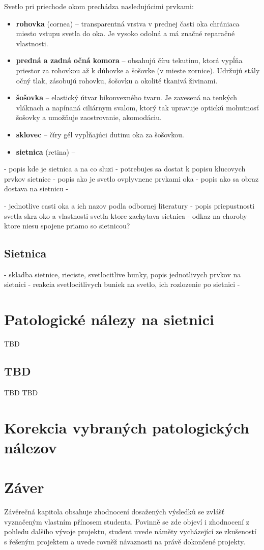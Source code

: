 Svetlo pri priechode okom prechádza nasledujúcimi prvkami\cite{zloz_oka}:
\begin{itemize}
\item \textbf{rohovka} (cornea) -- transparentná vrstva v prednej časti oka chrániaca miesto vstupu svetla do oka. Je vysoko odolná a má značné reparačné vlastnosti.
\item \textbf{predná a zadná očná komora} -- obsahujú číru tekutinu, ktorá vypĺňa priestor za rohovkou až k dúhovke a šošovke (v mieste zornice). Udržujú stály očný tlak, zásobujú rohovku, šošovku a okolité tkanivá živinami.
\item \textbf{šošovka} -- elastický útvar bikonvexného tvaru. Je zavesená na tenkých vláknach a napínaná ciliárnym svalom, ktorý tak upravuje optickú mohutnosť šošovky a umožňuje zaostrovanie, akomodáciu.
\item \textbf{sklovec} -- číry gél vypĺňajúci dutinu oka za šošovkou.
\item \textbf{sietnica} (retina) -- 
\end{itemize}

- popis kde je sietnica a na co sluzi \cite{vlast_oka}
- potrebujes sa dostat k popisu klucovych prvkov sietnice
- popis ako je svetlo ovplyvnene prvkami oka
- popis ako sa obraz dostava na sietnicu
- 

- jednotlive casti oka a ich nazov podla odbornej literatury
- popis priepustnosti svetla skrz oko a vlastnosti svetla ktore zachytava sietnica
- odkaz na choroby ktore niesu spojene priamo so sietnicou?

\section{Sietnica}\label{sec:sietnica}
- skladba sietnice, rieciste, svetlocitlive bunky, popis jednotlivych prvkov na sietnici
- reakcia svetlocitlivych buniek na svetlo, ich rozlozenie po sietnici
- 

\chapter{Patologické nálezy na sietnici}\label{ch:kap2}
TBD\cite{prim}
\section{TBD}
TBD\cite{sec}
TBD\cite{bio}

\chapter{Korekcia vybraných patologických nálezov}


\chapter{Záver}
Závěrečná kapitola obsahuje zhodnocení dosažených výsledků se zvlášť vyznačeným vlastním přínosem studenta. Povinně se zde objeví i zhodnocení z pohledu dalšího vývoje projektu, student uvede náměty vycházející ze zkušeností s řešeným projektem a uvede rovněž návaznosti na právě dokončené projekty.

